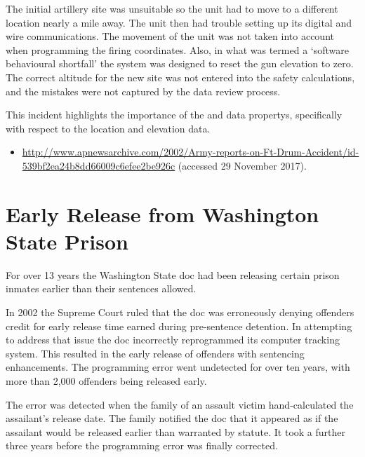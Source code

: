 The initial artillery site was unsuitable so the unit had to move to a different location nearly a mile away. The unit then had trouble setting up its digital and wire communications. The movement of the unit was not taken into account when programming the firing coordinates. Also, in what was termed a `software behavioural shortfall' the system was designed to reset the gun elevation to zero. The correct altitude for the new site was not entered into the safety calculations, and the mistakes were not captured by the data review process.

This incident highlights the importance of the  and  \glspl{data property}, specifically with respect to the location and elevation data.

\begin{itemize}
	\item \raggedright{\href{http://www.apnewsarchive.com/2002/Army-reports-on-Ft-Drum-Accident/id-539bf2ea24b8dd66009c6efee2be926c}{http://www.apnewsarchive.com/2002/Army-reports-on-Ft-Drum-Accident/id- 539bf2ea24b8dd66009c6efee2be926c} (accessed 29 November 2017).}
\end{itemize}


\section{Early Release from Washington State Prison} \label{bkm:incacc:washprison}
For over 13 years the Washington State \gls{doc} had been releasing certain prison inmates earlier than their sentences allowed.

In 2002 the Supreme Court ruled that the \gls{doc} was erroneously denying offenders credit for early release time earned during pre-sentence detention. In attempting to address that issue the \gls{doc} incorrectly reprogrammed its computer tracking system. This resulted in the early release of offenders with sentencing enhancements. The programming error went undetected for over ten years, with more than 2,000 offenders being released early.

The error was detected when the family of an assault victim hand-calculated the assailant's release date. The family notified the \gls{doc} that it appeared as if the assailant would be released earlier than warranted by statute. It took a further three years before the programming error was finally corrected.

